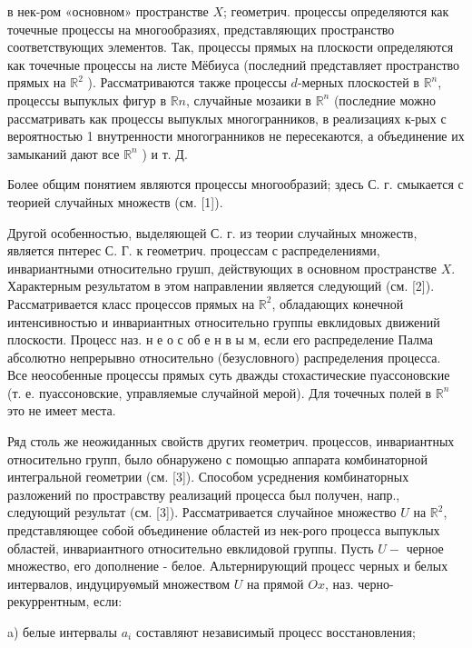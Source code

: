 \documentclass[10pt]{article}
\begin{document}
в нек-ром «основном» пространстве $X$; геометрич. процессы определяются как точечные процессы на многообразиях, представляющих пространство соответствующих элементов. Так, процессы прямых на плоскости определяются как точечные процессы на листе Мёбиуса (последний представляет пространство прямых на $\mathbb{R}^{2}$ ). Рассматриваются также процессы $d$-мерных плоскостей в $\mathbb{R}^{n}$, процессы выпуклых фигур в $\mathbb{R} n$, случайные мозаики в $\mathbb{R}^{n}$ (последние можно рассматривать как процессы выпуклых многогранников, в реализациях к-рых с вероятностью 1 внутренности многогранников не пересекаются, а объединение их замыканий дают все $\mathbb{R}^{n}$ ) и т. Д.



Более общим понятием являются процессы многообразий; здесь С. г. смыкается с теорией случайных множеств (см. [1]).



Другой особенностью, выделяющей С. г. из теории случайных множеств, является пнтерес С. Г. к геометрич. процессам с распределениями, инвариантными относительно грушп, действующих в основном пространстве $X$. Характерным результатом в этом направлении является следующий (см. [2]). Рассматривается класс процессов прямых на $\mathbb{R}^{2}$, обладающих конечной интенсивностью и инвариантных относительно группы евклидовых движений плоскости. Процесс наз. н е о с об е н в ы м, если его распределение Палма абсолютно непрерывно относительно (безусловного) распределения процесса. Все неособенные процессы прямых суть дважды стохастические пуассоновские (т. е. пуассоновские, управляемые случайной мерой). Для точечных полей в $\mathbb{R}^{n}$ это не имеет места.



Ряд столь же неожиданных свойств других геометрич. процессов, инвариантных относительно групп, было обнаружено с помощью аппарата комбинаторной интегральной геометрии (см. [3]). Способом усреднения комбинаторных разложений по простравству реализаций процесса был получен, напр., следующий результат (см. [3]). Рассматривается случайное множество $U$ на $\mathbb{R}^{2}$, представляющее собой объединение областей из нек-рого процесса выпуклых областей, инвариантного относительно евклидовой группы. Пусть $U-$ черное множество, его дополнение - белое. Альтернирующий процесс черных и белых интервалов, индуцируөмый множеством $U$ на прямой $O x$, наз. черно-рекуррентным, если:



a) белые интервалы $a_{i}$ составляют независимый процесс восстановления;
\end{document}
